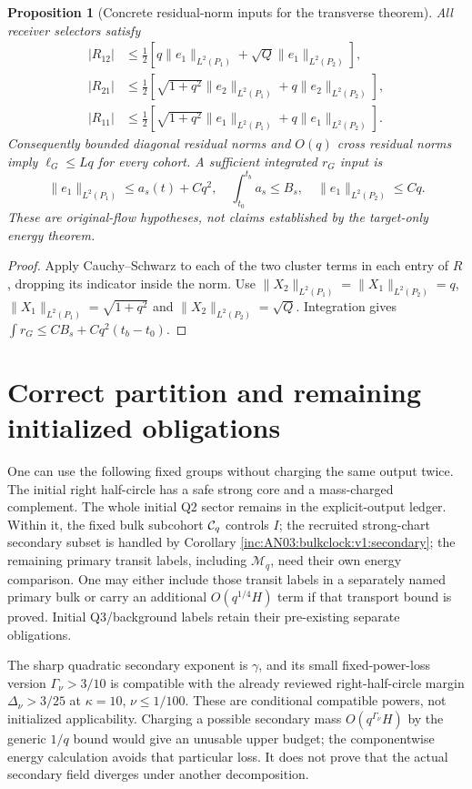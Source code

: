 \documentclass[11pt]{article}
\newtheorem{proposition}[theorem]{Proposition}
\theoremstyle{remark}\newtheorem{remark}[theorem]{Remark}
\begin{document}
\begin{proposition}[Concrete residual-norm inputs for the transverse theorem]
\label{inc:AN03:bulkclock:v1:residualinputs}
All receiver selectors satisfy
\begin{align*}
 |R_{12}|&\le\tfrac12[q\|e_1\|_{L^2(P_1)}+\sqrt Q\|e_1\|_{L^2(P_2)}],\\
 |R_{21}|&\le\tfrac12[\sqrt{1+q^2}\|e_2\|_{L^2(P_1)}+q\|e_2\|_{L^2(P_2)}],\\
 |R_{11}|&\le\tfrac12[\sqrt{1+q^2}\|e_1\|_{L^2(P_1)}+q\|e_1\|_{L^2(P_2)}].
\end{align*}
Consequently bounded diagonal residual norms and $O(q)$ cross residual norms imply $\ell_G\le Lq$ for every cohort. A sufficient integrated $r_G$ input is
\[
 \|e_1\|_{L^2(P_1)}\le a_s(t)+Cq^2,\quad
 \int_{t_0}^{t_b}a_s\le B_s,\quad
 \|e_1\|_{L^2(P_2)}\le Cq.
\]
These are original-flow hypotheses, not claims established by the target-only energy theorem.
\end{proposition}
\begin{proof}
Apply Cauchy--Schwarz to each of the two cluster terms in each entry of $R$, dropping its indicator inside the norm. Use $\|X_2\|_{L^2(P_1)}=\|X_1\|_{L^2(P_2)}=q$, $\|X_1\|_{L^2(P_1)}=\sqrt{1+q^2}$ and $\|X_2\|_{L^2(P_2)}=\sqrt Q$. Integration gives $\int r_G\le C B_s+Cq^2(t_b-t_0)$.
\end{proof}

\section{Correct partition and remaining initialized obligations}
One can use the following fixed groups without charging the same output twice. The initial right half-circle has a safe strong core and a mass-charged complement. The whole initial Q2 sector remains in the explicit-output ledger. Within it, the fixed bulk subcohort $\mathcal C_q$ controls $I$; the recruited strong-chart secondary subset is handled by Corollary \ref{inc:AN03:bulkclock:v1:secondary}; the remaining primary transit labels, including $\mathcal M_q$, need their own energy comparison. One may either include those transit labels in a separately named primary bulk or carry an additional $O(q^{1/4}H)$ term if that transport bound is proved. Initial Q3/background labels retain their pre-existing separate obligations.

The sharp quadratic secondary exponent is $\gamma$, and its small fixed-power-loss version $\Gamma_\nu>3/10$ is compatible with the already reviewed right-half-circle margin $\Delta_\nu>3/25$ at $\kappa=10$, $\nu\le1/100$. These are conditional compatible powers, not initialized applicability. Charging a possible secondary mass $O(q^{\Gamma_\nu}H)$ by the generic $1/q$ bound would give an unusable upper budget; the componentwise energy calculation avoids that particular loss. It does not prove that the actual secondary field diverges under another decomposition.
\end{document}
